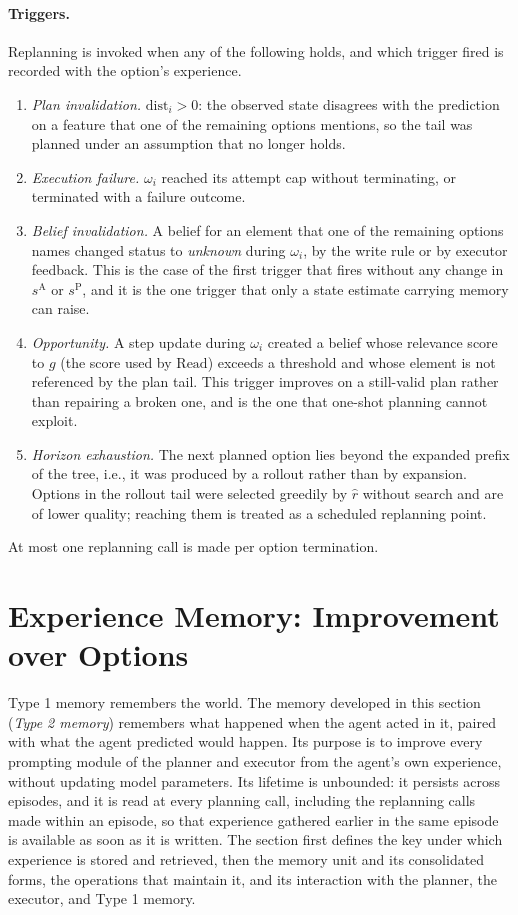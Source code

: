 \documentclass[11pt]{article}
\newcommand{\sA}{s^{\mathrm{A}}}
\newcommand{\sP}{s^{\mathrm{P}}}
\newcommand{\Read}{\mathrm{Read}}
\newcommand{\dist}{\mathrm{dist}}
\begin{document}
\paragraph{Triggers.}
Replanning is invoked when any of the following holds, and which trigger fired is recorded with the option's experience.
\begin{enumerate}[leftmargin=1.5em,itemsep=1pt]
\item \emph{Plan invalidation.} $\dist_i>0$: the observed state disagrees with the prediction on a feature that one of the remaining options mentions, so the tail was planned under an assumption that no longer holds.
\item \emph{Execution failure.} $\omega_i$ reached its attempt cap without terminating, or terminated with a failure outcome.
\item \emph{Belief invalidation.} A belief for an element that one of the remaining options names changed status to \emph{unknown} during $\omega_i$, by the write rule or by executor feedback. This is the case of the first trigger that fires without any change in $\sA$ or $\sP$, and it is the one trigger that only a state estimate carrying memory can raise.
\item \emph{Opportunity.} A step update during $\omega_i$ created a belief whose relevance score to $g$ (the score used by $\Read$) exceeds a threshold and whose element is not referenced by the plan tail. This trigger improves on a still-valid plan rather than repairing a broken one, and is the one that one-shot planning cannot exploit.
\item \emph{Horizon exhaustion.} The next planned option lies beyond the expanded prefix of the tree, i.e., it was produced by a rollout rather than by expansion. Options in the rollout tail were selected greedily by $\hat r$ without search and are of lower quality; reaching them is treated as a scheduled replanning point.
\end{enumerate}
At most one replanning call is made per option termination.

\section{Experience Memory: Improvement over Options}
\label{sec:type2}

Type 1 memory remembers the world. The memory developed in this section (\emph{Type 2 memory}) remembers what happened when the agent acted in it, paired with what the agent predicted would happen. Its purpose is to improve every prompting module of the planner and executor from the agent's own experience, without updating model parameters. Its lifetime is unbounded: it persists across episodes, and it is read at every planning call, including the replanning calls made within an episode, so that experience gathered earlier in the same episode is available as soon as it is written. The section first defines the key under which experience is stored and retrieved, then the memory unit and its consolidated forms, the operations that maintain it, and its interaction with the planner, the executor, and Type 1 memory.
\end{document}
